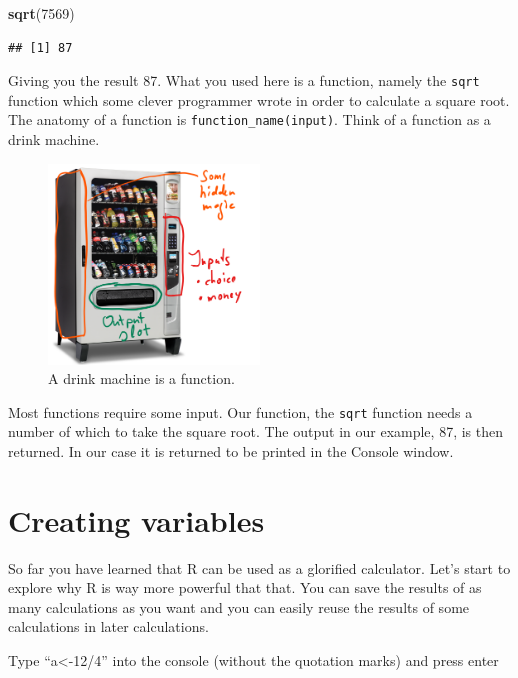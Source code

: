 \documentclass[
]{article}
\newenvironment{Shaded}{\begin{snugshade}}{\end{snugshade}}
\newcommand{\DecValTok}[1]{\textcolor[rgb]{0.00,0.00,0.81}{#1}}
\newcommand{\FunctionTok}[1]{\textcolor[rgb]{0.13,0.29,0.53}{\textbf{#1}}}
\newcommand{\NormalTok}[1]{#1}
\begin{document}
\begin{Shaded}
\begin{Highlighting}[]
\FunctionTok{sqrt}\NormalTok{(}\DecValTok{7569}\NormalTok{)}
\end{Highlighting}
\end{Shaded}

\begin{verbatim}
## [1] 87
\end{verbatim}

Giving you the result 87. What you used here is a function, namely the
\texttt{sqrt} function which some clever programmer wrote in order to
calculate a square root. The anatomy of a function is
\texttt{function\_name(input)}. Think of a function as a drink machine.

\begin{figure}
\centering
\includegraphics[width=0.5\textwidth,height=\textheight]{images/DrinkMachine.png}
\caption{A drink machine is a function.}
\end{figure}

Most functions require some input. Our function, the \texttt{sqrt}
function needs a number of which to take the square root. The output in
our example, 87, is then returned. In our case it is returned to be
printed in the Console window.

\hypertarget{creating-variables}{%
\section{Creating variables}\label{creating-variables}}

So far you have learned that R can be used as a glorified calculator.
Let's start to explore why R is way more powerful that that. You can
save the results of as many calculations as you want and you can easily
reuse the results of some calculations in later calculations.

Type ``a\textless-12/4'' into the console (without the quotation marks)
and press enter
\end{document}
